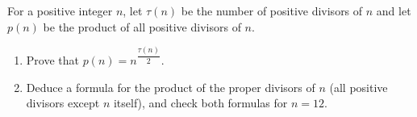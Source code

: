 For a positive integer $n$, let $\tau(n)$ be the number of positive divisors of $n$ and let $p(n)$ be the product of all positive divisors of $n$.
\begin{enumerate}
\item[(a)] Prove that $p(n)=n^{\dfrac{\tau(n)}{2}}$.
\item[(b)] Deduce a formula for the product of the proper divisors of $n$ (all positive divisors except $n$ itself), and check both formulas for $n=12$.
\end{enumerate}
